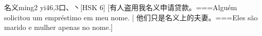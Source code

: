 \begin{EntryWithPhonetic}{名义}{ming2 yi4}{6,3}{⼝、⼂}[HSK 6]
  [有人盗用我名义申请贷款。===Alguém solicitou um empréstimo em meu nome. | 他们只是名义上的夫妻。===Eles são marido e mulher apenas no nome.]
\end{EntryWithPhonetic}
